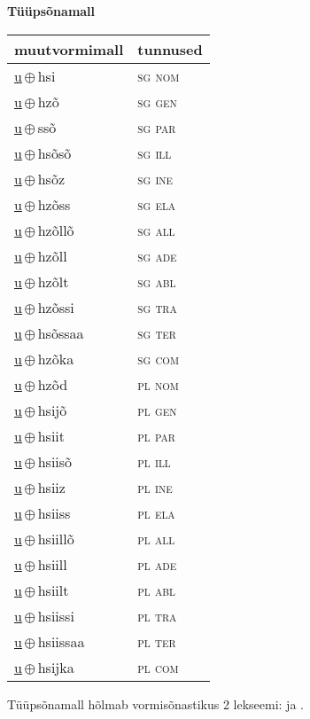 

\vspace{3.5em}
\noindent \begin{minipage}{\textwidth}
\noindent \textbf{Tüüpsõnamall \,}\\

\begin{sideways}
\begin{tabular}{l l}
muutvormimall & tunnused \\
\hline
\underline{u}\,$\oplus$\,hsi & \textsc{ sg nom } \\
\underline{u}\,$\oplus$\,hzõ & \textsc{ sg gen } \\
\underline{u}\,$\oplus$\,ssõ & \textsc{ sg par } \\
\underline{u}\,$\oplus$\,hsõsõ & \textsc{ sg ill } \\
\underline{u}\,$\oplus$\,hsõz & \textsc{ sg ine } \\
\underline{u}\,$\oplus$\,hzõss & \textsc{ sg ela } \\
\underline{u}\,$\oplus$\,hzõllõ & \textsc{ sg all } \\
\underline{u}\,$\oplus$\,hzõll & \textsc{ sg ade } \\
\underline{u}\,$\oplus$\,hzõlt & \textsc{ sg abl } \\
\underline{u}\,$\oplus$\,hzõssi & \textsc{ sg tra } \\
\underline{u}\,$\oplus$\,hsõssaa & \textsc{ sg ter } \\
\underline{u}\,$\oplus$\,hzõka & \textsc{ sg com } \\
\underline{u}\,$\oplus$\,hzõd & \textsc{ pl nom } \\
\underline{u}\,$\oplus$\,hsijõ & \textsc{ pl gen } \\
\underline{u}\,$\oplus$\,hsiit & \textsc{ pl par } \\
\underline{u}\,$\oplus$\,hsiisõ & \textsc{ pl ill } \\
\underline{u}\,$\oplus$\,hsiiz & \textsc{ pl ine } \\
\underline{u}\,$\oplus$\,hsiiss & \textsc{ pl ela } \\
\underline{u}\,$\oplus$\,hsiillõ & \textsc{ pl all } \\
\underline{u}\,$\oplus$\,hsiill & \textsc{ pl ade } \\
\underline{u}\,$\oplus$\,hsiilt & \textsc{ pl abl } \\
\underline{u}\,$\oplus$\,hsiissi & \textsc{ pl tra } \\
\underline{u}\,$\oplus$\,hsiissaa & \textsc{ pl ter } \\
\underline{u}\,$\oplus$\,hsijka & \textsc{ pl com } \\
\end{tabular}
\end{sideways}
\label{tab:tüüpsõnamall-uhsi}

\end{minipage}

 
\vspace{1em}
\noindent Tüüpsõnamall  hõlmab vormisõnastikus 2 lekseemi:  ja .
